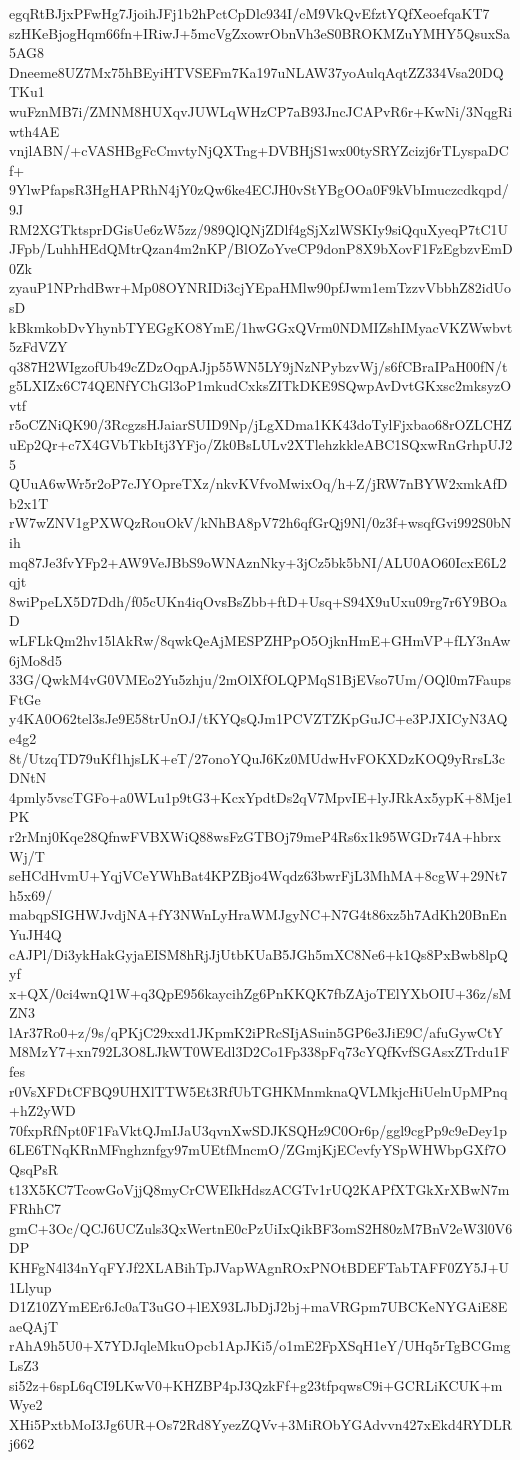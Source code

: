 egqRtBJjxPFwHg7JjoihJFj1b2hPctCpDlc934I/cM9VkQvEfztYQfXeoefqaKT7
szHKeBjogHqm66fn+IRiwJ+5mcVgZxowrObnVh3eS0BROKMZuYMHY5QsuxSa5AG8
Dneeme8UZ7Mx75hBEyiHTVSEFm7Ka197uNLAW37yoAulqAqtZZ334Vsa20DQTKu1
wuFznMB7i/ZMNM8HUXqvJUWLqWHzCP7aB93JncJCAPvR6r+KwNi/3NqgRiwth4AE
vnjlABN/+cVASHBgFcCmvtyNjQXTng+DVBHjS1wx00tySRYZcizj6rTLyspaDCf+
9YlwPfapsR3HgHAPRhN4jY0zQw6ke4ECJH0vStYBgOOa0F9kVbImuczcdkqpd/9J
RM2XGTktsprDGisUe6zW5zz/989QlQNjZDlf4gSjXzlWSKIy9siQquXyeqP7tC1U
JFpb/LuhhHEdQMtrQzan4m2nKP/BlOZoYveCP9donP8X9bXovF1FzEgbzvEmD0Zk
zyauP1NPrhdBwr+Mp08OYNRIDi3cjYEpaHMlw90pfJwm1emTzzvVbbhZ82idUosD
kBkmkobDvYhynbTYEGgKO8YmE/1hwGGxQVrm0NDMIZshIMyacVKZWwbvt5zFdVZY
q387H2WIgzofUb49cZDzOqpAJjp55WN5LY9jNzNPybzvWj/s6fCBraIPaH00fN/t
g5LXIZx6C74QENfYChGl3oP1mkudCxksZITkDKE9SQwpAvDvtGKxsc2mksyzOvtf
r5oCZNiQK90/3RcgzsHJaiarSUID9Np/jLgXDma1KK43doTylFjxbao68rOZLCHZ
uEp2Qr+c7X4GVbTkbItj3YFjo/Zk0BsLULv2XTlehzkkleABC1SQxwRnGrhpUJ25
QUuA6wWr5r2oP7cJYOpreTXz/nkvKVfvoMwixOq/h+Z/jRW7nBYW2xmkAfDb2x1T
rW7wZNV1gPXWQzRouOkV/kNhBA8pV72h6qfGrQj9Nl/0z3f+wsqfGvi992S0bNih
mq87Je3fvYFp2+AW9VeJBbS9oWNAznNky+3jCz5bk5bNI/ALU0AO60IcxE6L2qjt
8wiPpeLX5D7Ddh/f05cUKn4iqOvsBsZbb+ftD+Usq+S94X9uUxu09rg7r6Y9BOaD
wLFLkQm2hv15lAkRw/8qwkQeAjMESPZHPpO5OjknHmE+GHmVP+fLY3nAw6jMo8d5
33G/QwkM4vG0VMEo2Yu5zhju/2mOlXfOLQPMqS1BjEVso7Um/OQl0m7FaupsFtGe
y4KA0O62tel3sJe9E58trUnOJ/tKYQsQJm1PCVZTZKpGuJC+e3PJXICyN3AQe4g2
8t/UtzqTD79uKf1hjsLK+eT/27onoYQuJ6Kz0MUdwHvFOKXDzKOQ9yRrsL3cDNtN
4pmly5vscTGFo+a0WLu1p9tG3+KcxYpdtDs2qV7MpvIE+lyJRkAx5ypK+8Mje1PK
r2rMnj0Kqe28QfnwFVBXWiQ88wsFzGTBOj79meP4Rs6x1k95WGDr74A+hbrxWj/T
seHCdHvmU+YqjVCeYWhBat4KPZBjo4Wqdz63bwrFjL3MhMA+8cgW+29Nt7h5x69/
mabqpSIGHWJvdjNA+fY3NWnLyHraWMJgyNC+N7G4t86xz5h7AdKh20BnEnYuJH4Q
cAJPl/Di3ykHakGyjaEISM8hRjJjUtbKUaB5JGh5mXC8Ne6+k1Qs8PxBwb8lpQyf
x+QX/0ci4wnQ1W+q3QpE956kaycihZg6PnKKQK7fbZAjoTElYXbOIU+36z/sMZN3
lAr37Ro0+z/9s/qPKjC29xxd1JKpmK2iPRcSIjASuin5GP6e3JiE9C/afuGywCtY
M8MzY7+xn792L3O8LJkWT0WEdl3D2Co1Fp338pFq73cYQfKvfSGAsxZTrdu1Ffes
r0VsXFDtCFBQ9UHXlTTW5Et3RfUbTGHKMnmknaQVLMkjcHiUelnUpMPnq+hZ2yWD
70fxpRfNpt0F1FaVktQJmIJaU3qvnXwSDJKSQHz9C0Or6p/ggl9cgPp9c9eDey1p
6LE6TNqKRnMFnghznfgy97mUEtfMncmO/ZGmjKjECevfyYSpWHWbpGXf7OQsqPsR
t13X5KC7TcowGoVjjQ8myCrCWEIkHdszACGTv1rUQ2KAPfXTGkXrXBwN7mFRhhC7
gmC+3Oc/QCJ6UCZuls3QxWertnE0cPzUiIxQikBF3omS2H80zM7BnV2eW3l0V6DP
KHFgN4l34nYqFYJf2XLABihTpJVapWAgnROxPNOtBDEFTabTAFF0ZY5J+U1Llyup
D1Z10ZYmEEr6Jc0aT3uGO+lEX93LJbDjJ2bj+maVRGpm7UBCKeNYGAiE8EaeQAjT
rAhA9h5U0+X7YDJqleMkuOpcb1ApJKi5/o1mE2FpXSqH1eY/UHq5rTgBCGmgLsZ3
si52z+6spL6qCI9LKwV0+KHZBP4pJ3QzkFf+g23tfpqwsC9i+GCRLiKCUK+mWye2
XHi5PxtbMoI3Jg6UR+Os72Rd8YyezZQVv+3MiRObYGAdvvn427xEkd4RYDLRj662
